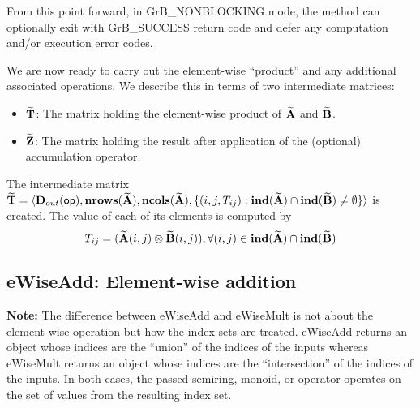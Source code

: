 From this point forward, in {\sf GrB\_NONBLOCKING} mode, the method can 
optionally exit with {\sf GrB\_SUCCESS} return code and defer any computation 
and/or execution error codes.

We are now ready to carry out the element-wise ``product'' and any additional 
associated operations.  We describe this in terms of two intermediate matrices:
\begin{itemize}
    \item ${\bf \widetilde{T}}$: The matrix holding the element-wise product of
    ${\bf \widetilde{A}}$ and ${\bf \widetilde{B}}$.
    \item ${\bf \widetilde{Z}}$: The matrix holding the result after 
    application of the (optional) accumulation operator.
\end{itemize}

The intermediate matrix ${\bf \widetilde{T}} = \langle
\mbox{$\mathbf{D}_{out}$}({\sf op}), \bold{nrows}({\bf \widetilde{A}}), \bold{ncols}({\bf \widetilde{A}}),
\{(i,j,T_{ij}) : \bold{ind}({\bf \widetilde{A}}) \cap 
\bold{ind}({\bf \widetilde{B}}) \neq \emptyset \} \rangle$
is created.  The value of each of its elements is computed by 
\[T_{ij} = ({\bf \widetilde{A}}(i,j)
\otimes {\bf \widetilde{B}}(i,j)), \forall (i,j) \in 
\bold{ind}({\bf \widetilde{A}}) \cap 
\bold{ind}({\bf \widetilde{B}})\]








\subsection{{\sf eWiseAdd}: Element-wise addition}

{\bf Note:} The difference between {\sf eWiseAdd} and {\sf eWiseMult} is not 
about the element-wise operation but how the index sets are treated.
{\sf eWiseAdd} returns an object whose indices are the ``union'' of the indices 
of the inputs whereas  
{\sf eWiseMult} returns an object whose indices are the ``intersection'' of the 
indices of the inputs. In both cases, the passed semiring, monoid, or operator 
operates on the set of values from the resulting index set. 


